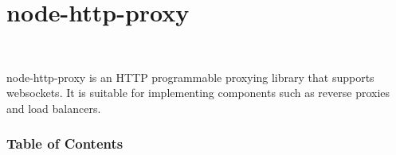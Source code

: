  

\section*{node-\/http-\/proxy }

\href{https://travis-ci.org/nodejitsu/node-http-proxy}{\tt }~~ \href{https://coveralls.io/r/nodejitsu/node-http-proxy}{\tt } 

{\ttfamily node-\/http-\/proxy} is an H\+T\+TP programmable proxying library that supports websockets. It is suitable for implementing components such as reverse proxies and load balancers.

\subsubsection*{Table of Contents}


